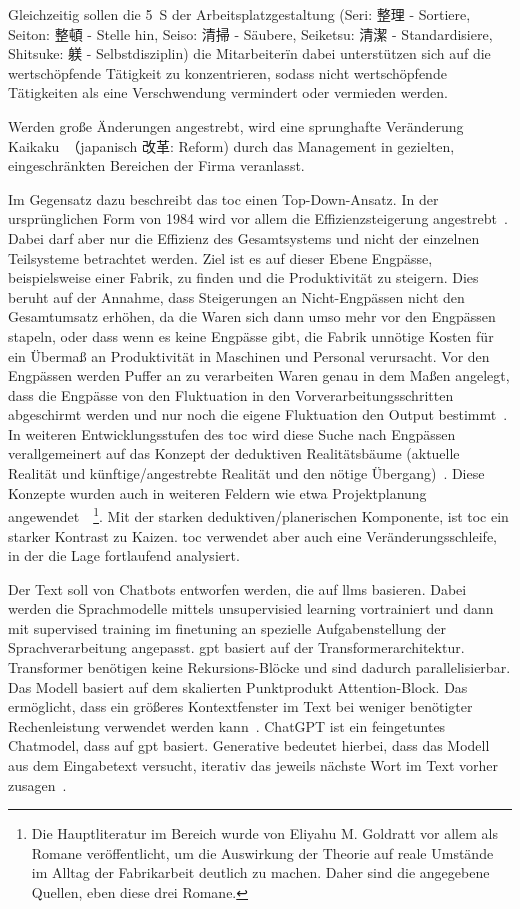 \documentclass[acmengage,authorversion,nonacm]{acmart}
\begin{document}
Gleichzeitig sollen die 5~S der Arbeitsplatzgestaltung (Seri: 整理 - Sortiere, Seiton: 整頓 - Stelle hin, Seiso: 清掃 - Säubere, Seiketsu: 清潔 - Standardisiere, Shitsuke:  躾 - Selbstdisziplin) die Mitarbeiterïn dabei unterstützen sich auf die wertschöpfende Tätigkeit zu konzentrieren, sodass nicht wertschöpfende Tätigkeiten als eine Verschwendung vermindert oder vermieden werden.

Werden große Änderungen angestrebt, wird eine sprunghafte Veränderung Kaikaku~（japanisch 改革: Reform) durch das Management in gezielten, eingeschränkten Bereichen der Firma veranlasst.

Im Gegensatz dazu beschreibt das \gls{toc} einen Top-Down-Ansatz. In der ursprünglichen Form von 1984 wird vor allem die Effizienzsteigerung angestrebt~\cite{goldratt_its_2011}. Dabei darf aber nur die Effizienz des Gesamtsystems und nicht der einzelnen Teilsysteme betrachtet werden. Ziel ist es auf dieser Ebene Engpässe, beispielsweise einer Fabrik, zu finden und die Produktivität zu steigern. Dies beruht auf der Annahme, dass Steigerungen an Nicht-Engpässen nicht den Gesamtumsatz erhöhen, da die Waren sich dann umso mehr vor den Engpässen stapeln, oder dass wenn es keine Engpässe gibt, die Fabrik unnötige Kosten für ein Übermaß an Produktivität in Maschinen und Personal verursacht. Vor den Engpässen werden Puffer an zu verarbeiten Waren genau in dem Maßen angelegt, dass die Engpässe von den Fluktuation in den Vorverarbeitungsschritten abgeschirmt werden und nur noch die eigene Fluktuation den Output bestimmt~\cite{goldratt_goal_2012}. In weiteren Entwicklungsstufen des \gls{toc} wird diese Suche nach Engpässen verallgemeinert auf das Konzept der deduktiven Realitätsbäume (aktuelle Realität und künftige/angestrebte Realität und den nötige Übergang)~\cite{goldratt_its_2011}. Diese Konzepte wurden auch in weiteren Feldern wie etwa Projektplanung angewendet~\cite{goldratt_critical_2002}~\footnote{Die Hauptliteratur im Bereich wurde von Eliyahu M. Goldratt vor allem als Romane veröffentlicht, um die Auswirkung der Theorie auf reale Umstände im Alltag der Fabrikarbeit deutlich zu machen. Daher sind die angegebene Quellen, eben diese drei Romane.}. Mit der starken deduktiven/planerischen Komponente, ist \gls{toc} ein starker Kontrast zu Kaizen. \gls{toc} verwendet aber auch eine Veränderungsschleife, in der die Lage fortlaufend analysiert.

Der Text soll von Chatbots entworfen werden, die auf \glspl{llm} basieren.
Dabei werden die Sprachmodelle mittels unsupervisied learning vortrainiert und dann mit supervised training im finetuning an spezielle Aufgabenstellung der Sprachverarbeitung angepasst. \gls{gpt} basiert auf der Transformerarchitektur. Transformer benötigen keine Rekursions-Blöcke und sind dadurch parallelisierbar. Das Modell basiert auf dem skalierten Punktprodukt Attention-Block. Das ermöglicht, dass ein größeres Kontextfenster im Text bei weniger benötigter Rechenleistung verwendet werden kann~\cite{vaswani_attention_2023}. ChatGPT ist ein feingetuntes Chatmodel, dass auf \gls{gpt} basiert.
Generative bedeutet hierbei, dass das Modell aus dem Eingabetext versucht, iterativ das jeweils nächste Wort im Text vorher zusagen~\cite{raschka_build_2025}.
\end{document}
